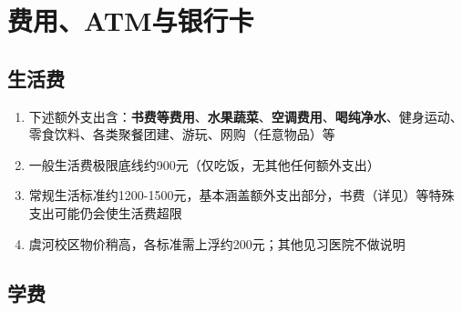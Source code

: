 \section[费用、ATM与银行卡]{费用、ATM与银行卡}

\subsection[生活费]{生活费}
\begin{enumerate}
    \item 下述额外支出含：\textbf{书费等费用}、\textbf{水果蔬菜}、\textbf{空调费用}、\textbf{喝纯净水}、健身运动、零食饮料、各类聚餐团建、游玩、网购（任意物品）等
    \item 一般生活费极限底线约900元（仅吃饭，无其他任何额外支出\footnotemark）
    \item 常规生活标准约1200-1500元，基本涵盖额外支出部分，书费（详见）等特殊支出可能仍会使生活费超限
    \item 虞河校区物价稍高，各标准需上浮约200元；其他见习医院不做说明
\end{enumerate}

\subsection[学费]{学费\footnotemark}
